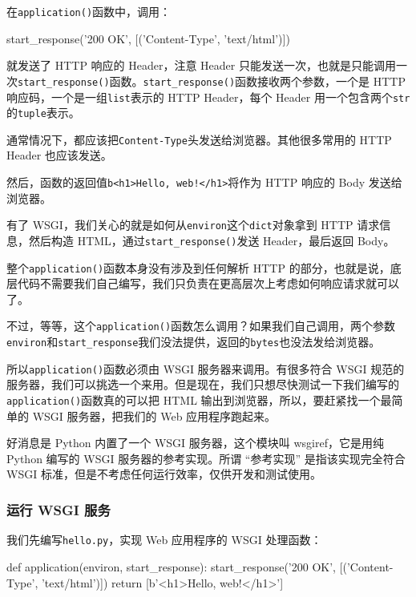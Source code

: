 在\texttt{application()}函数中，调用：

\begin{pythoncode}
start_response('200 OK', [('Content-Type', 'text/html')])
\end{pythoncode}

就发送了 HTTP 响应的 Header，注意 Header
只能发送一次，也就是只能调用一次\texttt{start\_response()}函数。\texttt{start\_response()}函数接收两个参数，一个是
HTTP 响应码，一个是一组\texttt{list}表示的 HTTP Header，每个 Header
用一个包含两个\texttt{str}的\texttt{tuple}表示。

通常情况下，都应该把\texttt{Content-Type}头发送给浏览器。其他很多常用的
HTTP Header 也应该发送。

然后，函数的返回值\texttt{b\textquotesingle{}\textless{}h1\textgreater{}Hello,\ web!\textless{}/h1\textgreater{}\textquotesingle{}}将作为
HTTP 响应的 Body 发送给浏览器。

有了 WSGI，我们关心的就是如何从\texttt{environ}这个\texttt{dict}对象拿到
HTTP 请求信息，然后构造 HTML，通过\texttt{start\_response()}发送
Header，最后返回 Body。

整个\texttt{application()}函数本身没有涉及到任何解析 HTTP
的部分，也就是说，底层代码不需要我们自己编写，我们只负责在更高层次上考虑如何响应请求就可以了。

不过，等等，这个\texttt{application()}函数怎么调用？如果我们自己调用，两个参数\texttt{environ}和\texttt{start\_response}我们没法提供，返回的\texttt{bytes}也没法发给浏览器。

所以\texttt{application()}函数必须由 WSGI 服务器来调用。有很多符合 WSGI
规范的服务器，我们可以挑选一个来用。但是现在，我们只想尽快测试一下我们编写的\texttt{application()}函数真的可以把
HTML 输出到浏览器，所以，要赶紧找一个最简单的 WSGI 服务器，把我们的 Web
应用程序跑起来。

好消息是 Python 内置了一个 WSGI 服务器，这个模块叫 wsgiref，它是用纯
Python 编写的 WSGI 服务器的参考实现。所谓 ``参考实现''
是指该实现完全符合 WSGI
标准，但是不考虑任何运行效率，仅供开发和测试使用。

\hypertarget{ux8fd0ux884c-wsgi-ux670dux52a1}{%
\subsubsection{运行 WSGI 服务}\label{ux8fd0ux884c-wsgi-ux670dux52a1}}

我们先编写\texttt{hello.py}，实现 Web 应用程序的 WSGI 处理函数：

\begin{pythoncode}
def application(environ, start_response):
    start_response('200 OK', [('Content-Type', 'text/html')])
    return [b'<h1>Hello, web!</h1>']
\end{pythoncode}

